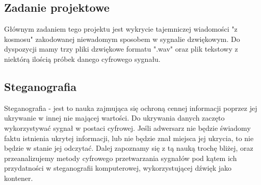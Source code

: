 \documentclass[a4paper,titleauthor]{mwart}
\begin{document}
\subsection{Zadanie projektowe}

Głównym zadaniem tego projektu jest wykrycie tajemniczej wiadomości "z kosmosu" zakodowanej niewadomym sposobem w sygnalie dzwiękowym. Do dyspozycji mamy trzy pliki dzwiękowe formatu ".wav" oraz plik tekstowy z niektórą ilością próbek danego cyfrowego sygnału. \newline  \newline 

\subsection{Steganografia}

Steganografia - jest to nauka zajmująca się ochroną cennej informacji poprzez jej ukrywanie w innej nie mającej wartości. Do ukrywania danych zaczęto wykorzystywać sygnał w postaci cyfrowej. \newline Jeśli adwersarz nie będzie świadomy faktu istnienia ukrytej informacji, lub nie będzie znał miejsca jej ukrycia, to nie będzie w stanie jej odczytać. \newline \newline 
Dalej zapoznamy się z tą nauką trochę bliżej, oraz przeanalizujemy metody cyfrowego przetwarzania sygnałów pod kątem ich przydatności w steganografii komputerowej, wykorzystującej dźwięk jako kontener.
\end{document}
